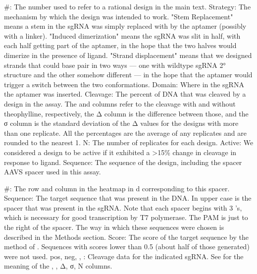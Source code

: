 \documentclass[10pt,oneside]{article}
\begin{document}
    \#: The number used to refer to a rational design in the main text.
    Strategy: The mechanism by which the design was intended to work.  "Stem Replacement" means a stem in the sgRNA was simply replaced with by the aptamer (possibly with a linker).  "Induced dimerization" means the sgRNA was slit in half, with each half getting part of the aptamer, in the hope that the two halves would dimerize in the presence of ligand.  "Strand displacement" means that we designed strands that could base pair in two ways --- one with wildtype sgRNA 2° structure and the other somehow different --- in the hope that the aptamer would trigger a switch between the two conformations.
    Domain: Where in the sgRNA the aptamer was inserted.
    Cleavage: The percent of DNA that was cleaved by a design in the \invitro{} assay.  The \apo{} and \holo{} columns refer to the cleavage with and without theophylline, respectively, the Δ column is the difference between those, and the σ column is the standard deviation of the Δ values for the designs with more than one replicate.  All the percentages are the average of any replicates and are rounded to the nearest 1.
    N: The number of replicates for each design.
    Active: We considered a design to be active if it exhibited a >15\% change in cleavage in response to ligand.  
% 
% 
    Sequence: The sequence of the design, including the spacer AAVS spacer used in this assay.



    \#: The row and column in the heatmap in d corresponding to this spacer.
    Sequence: The  target sequence that was present in the DNA.  In upper case is the  spacer that was present in the sgRNA.  Note that each spacer begins with 3 's, which is necessary for good transcription by T7 polymerase.  The  PAM is just to the right of the spacer.  The way in which these sequences were chosen is described in the Methods section.
    Score: The score of the target sequence by the method of .  Sequences with scores lower than 0.5 (about half of those generated) were not used.
    pos, neg, \ligrnaF{}, \ligrnaB{}: Cleavage data for the indicated sgRNA.  See  for the meaning of the \apo{}, \holo{}, Δ, σ, N columns.
\end{document}
